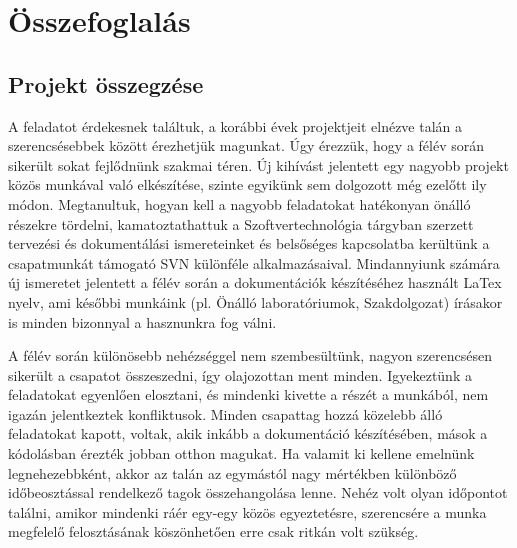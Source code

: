 

\setcounter{section}{13}




\fedlap

\section{Összefoglalás}

\subsection{Projekt összegzése}

A feladatot érdekesnek találtuk, a korábbi évek projektjeit elnézve talán a szerencsésebbek között érezhetjük magunkat. Úgy érezzük, hogy a félév során sikerült sokat fejlődnünk szakmai téren. Új kihívást jelentett egy nagyobb projekt közös munkával való elkészítése, szinte egyikünk sem dolgozott még ezelőtt ily módon. Megtanultuk, hogyan kell a nagyobb feladatokat hatékonyan önálló részekre tördelni, kamatoztathattuk a Szoftvertechnológia tárgyban szerzett tervezési és dokumentálási ismereteinket és belsőséges kapcsolatba kerültünk a csapatmunkát támogató SVN különféle alkalmazásaival. Mindannyiunk számára új ismeretet jelentett a félév során a dokumentációk készítéséhez használt LaTex nyelv, ami későbbi munkáink (pl. Önálló laboratóriumok, Szakdolgozat) írásakor is minden bizonnyal a hasznunkra fog válni.

A félév során különösebb nehézséggel nem szembesültünk, nagyon szerencsésen sikerült a csapatot összeszedni, így olajozottan ment minden. Igyekeztünk a feladatokat egyenlően elosztani, és mindenki kivette a részét a munkából, nem igazán jelentkeztek konfliktusok. Minden csapattag hozzá közelebb álló feladatokat kapott, voltak, akik inkább a dokumentáció készítésében, mások a kódolásban érezték jobban otthon magukat. Ha valamit ki kellene emelnünk legnehezebbként, akkor az talán az egymástól nagy mértékben különböző időbeosztással rendelkező tagok összehangolása lenne. Nehéz volt olyan időpontot találni, amikor mindenki ráér egy-egy közös egyeztetésre, szerencsére a munka megfelelő felosztásának köszönhetően erre csak ritkán volt szükség.

